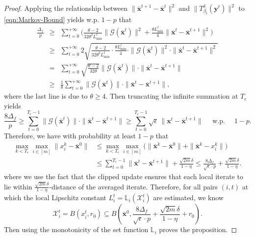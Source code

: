 \documentclass{article}
\newcommand{\cX}{\mathcal{X}}
\newcommand{\bL}{\mathbb{L}}
\newcommand{\bxt}{\mathbf{x}^t}
\newcommand{\byt}{\mathbf{y}^t}
\newcommand{\bbxt}{\bar{\mathbf{x}}^t}
\newcommand{\bbxte}{\bar{\mathbf{x}}^{t+1}}
\newcommand{\bx}{\mathbf{x}}
\begin{document}
\begin{proof}

Applying the relationship between 
$\|\bbxte-\bbxt\|^2$ and $\|T^\delta_{\beta_t}(\byt)\|^2$ to \eqref{eqn:Markov-Bound} yields w.p. $1-p$ that
\begin{eqnarray*}
    \frac{\Delta_f}{p} & \geq & 
\sum_{t=0}^{+\infty} \bigg(
\frac{\theta-2}{32\theta^2 L_{\min}^t}\|\mathcal{G}(\bbxt)\|^2
+
\frac{\theta L_{\min}^t}{4}\|\bbxt-\bbxte\|^2\bigg)\\
& \geq & \sum_{t=0}^{+\infty}2\sqrt{\frac{\theta-2}{32\theta^2 L_{\min}^t}\cdot\frac{\theta L_{\min}^t}{4}\cdot\|\mathcal{G}(\bbxt)\|^2 \cdot \|\bbxt-\bbxte\|^2} \\
& = & \sum_{t=0}^{+\infty}\sqrt{\frac{\theta-2}{32\theta}} \|\mathcal{G}(\bbxt)\| \cdot \|\bbxt-\bbxte\| \\
&\geq& \frac{1}{8}  
\sum_{t=0}^{+\infty}
\|\mathcal{G}(\bbxt)\| \cdot \|\bbxt-\bbxte\|,
\end{eqnarray*} 
where the last line is due to $\theta\geq4$. Then truncating the infinite summation at $T_\epsilon$ yields
\[
\frac{8\Delta_f}{p} 
\ge 
\sum_{t=0}^{T_\epsilon-1}
\|\mathcal{G}(\bbxt)\|\cdot \|\bbxt-\bbxte\|
\ge  
\sum_{t=0}^{T_\epsilon-1}
\sqrt{\epsilon}\, \|\bxt-\bbxte\|  \quad \mbox{ w.p. }\quad 1-p.
\]
Therefore, we have with probability at least $1-p$ that 
\begin{align}
\max_{k<T_\epsilon} \max_{i\in[m]} \|x_i^k - \bar{\bx}^0\| & \leq  \max_{k<T_\epsilon}\max_{i\in[m]}\Big(\|\bar{\bx}^k - \bar{\bx}^0\| + \|\bar{\bx}^k - x_i^k\|\Big)\nonumber\\
& \leq \sum_{t=0}^{T_\epsilon-1}
\|\bar{\bx}^t-\bar{\bx}^{t+1}\| + \frac{\sqrt{2m}\delta}{1-\eta} \leq 
\frac{8\Delta_f}{\sqrt{\epsilon}\cdot p} + \frac{\sqrt{2m}\delta}{1-\eta}. \nonumber
\end{align} 
where we use the fact that the clipped update ensures that each local iterate to lie within  $\frac{\sqrt{2m}\delta}{1-\eta}$-distance of the averaged iterate. Therefore, for all pairs $(i,t)$ at which the local Lipschitz  constant $L_i^t = \bL_i(\cX_i^t)$ are estimated, we know 
$$\cX_i^t = B(x_i^t,r_0)\subseteq B\left(\bar{\bx}^0,\frac{8\Delta_f}{\sqrt{\epsilon}\cdot p} + \frac{\sqrt{2m}\delta}{1-\eta}+r_0\right).$$
Then using the monotonicity of the set function $\bL_i$ proves the proposition. 
\end{proof}
\end{document}
